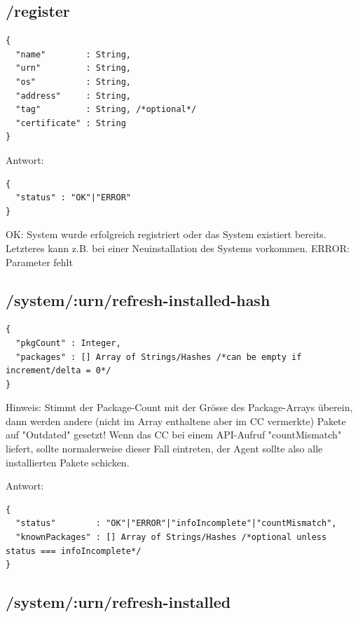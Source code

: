 \subsection*{/register}

\begin{verbatim}
{
  "name"        : String,
  "urn"         : String,
  "os"          : String,
  "address"     : String,
  "tag"         : String, /*optional*/
  "certificate" : String
}
\end{verbatim}


Antwort:

\begin{verbatim}
{
  "status" : "OK"|"ERROR" 
}
\end{verbatim}

OK: System wurde erfolgreich registriert oder das System existiert bereits. Letzteres kann z.B. bei einer Neuinstallation des Systems vorkommen.
ERROR: Parameter fehlt

\subsection*{/system/:urn/refresh-installed-hash}

\begin{verbatim}
{
  "pkgCount" : Integer,
  "packages" : [] Array of Strings/Hashes /*can be empty if increment/delta = 0*/
}
\end{verbatim}

Hinweis: Stimmt der Package-Count mit der Grösse des Package-Arrays überein, dann werden andere (nicht im Array enthaltene aber im CC vermerkte) Pakete auf "Outdated" gesetzt! Wenn das CC bei einem API-Aufruf "countMismatch" liefert, sollte normalerweise dieser Fall eintreten, der Agent sollte also alle installierten Pakete schicken.


Antwort:

\begin{verbatim}
{
  "status"        : "OK"|"ERROR"|"infoIncomplete"|"countMismatch",
  "knownPackages" : [] Array of Strings/Hashes /*optional unless status === infoIncomplete*/
}
\end{verbatim}


\subsection*{/system/:urn/refresh-installed}

